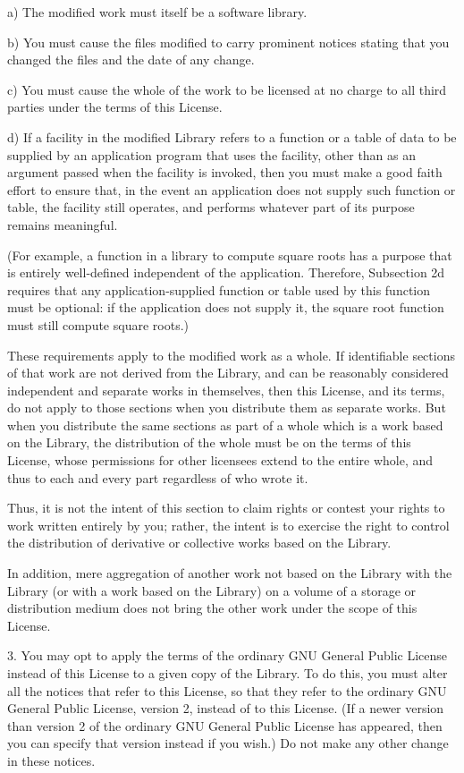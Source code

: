 \documentclass[twoside]{tceusermanual}
\begin{document}
    a) The modified work must itself be a software library.

    b) You must cause the files modified to carry prominent notices
    stating that you changed the files and the date of any change.

    c) You must cause the whole of the work to be licensed at no
    charge to all third parties under the terms of this License.

    d) If a facility in the modified Library refers to a function or a
    table of data to be supplied by an application program that uses
    the facility, other than as an argument passed when the facility
    is invoked, then you must make a good faith effort to ensure that,
    in the event an application does not supply such function or
    table, the facility still operates, and performs whatever part of
    its purpose remains meaningful.

    (For example, a function in a library to compute square roots has
    a purpose that is entirely well-defined independent of the
    application.  Therefore, Subsection 2d requires that any
    application-supplied function or table used by this function must
    be optional: if the application does not supply it, the square
    root function must still compute square roots.)

These requirements apply to the modified work as a whole.  If
identifiable sections of that work are not derived from the
Library, and can be reasonably considered independent and
separate works in themselves, then this License, and its terms,
do not apply to those sections when you distribute them as
separate works.  But when you distribute the same sections as
part of a whole which is a work based on the Library, the
distribution of the whole must be on the terms of this License,
whose permissions for other licensees extend to the entire
whole, and thus to each and every part regardless of who wrote
it.

Thus, it is not the intent of this section to claim rights or
contest your rights to work written entirely by you; rather, the
intent is to exercise the right to control the distribution of
derivative or collective works based on the Library.

In addition, mere aggregation of another work not based on the
Library with the Library (or with a work based on the Library)
on a volume of a storage or distribution medium does not bring
the other work under the scope of this License.

3. You may opt to apply the terms of the ordinary GNU General
Public License instead of this License to a given copy of the
Library.  To do this, you must alter all the notices that refer
to this License, so that they refer to the ordinary GNU General
Public License, version 2, instead of to this License.  (If a
newer version than version 2 of the ordinary GNU General Public
License has appeared, then you can specify that version instead
if you wish.)  Do not make any other change in these notices.
 
\end{document}
